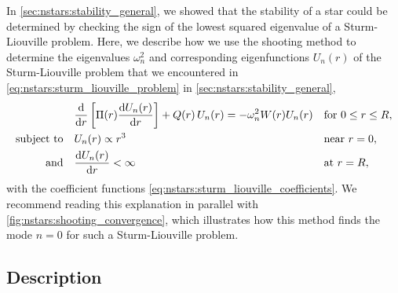 In \cref{sec:nstars:stability_general}, we showed that the stability of a star could be determined by checking the sign of the lowest squared eigenvalue of a Sturm-Liouville problem.
Here, we describe how we use the shooting method to determine the eigenvalues $\omega_n^2$ and corresponding eigenfunctions $U_n(r)$ of the Sturm-Liouville problem that we encountered in \cref{eq:nstars:sturm_liouville_problem} in \cref{sec:nstars:stability_general},
\begin{subequations}
\begin{align}
	&\odv*{ \left[ \Pi(r) \odv{U_n(r)}{r} \right] }{r} + Q(r) \, U_n(r) = -\omega_n^2 W(r) U_n(r) && \text{for } 0 \leq r \leq R , \label{eq:shooting:sturm_liouville_diffeq} \\
	\text{subject to} \quad & U_n(r)          \propto r^3    && \text{near } r=0 , \label{eq:shooting:sturm_liouville_bc1} \\
	\text{and}        \quad & \odv{U_n(r)}{r} <       \infty && \text{at } r=R , \label{eq:shooting:sturm_liouville_bc2}
\end{align}%
\label{eq:shooting:sturm_liouville_problem}%
\end{subequations}%
with the coefficient functions \eqref{eq:nstars:sturm_liouville_coefficients}.
We recommend reading this explanation in parallel with \cref{fig:nstars:shooting_convergence}, which illustrates how this method finds the mode $n=0$ for such a Sturm-Liouville problem.

\subsection*{Description}
\label{sec:numerics:shooting_method_description}

